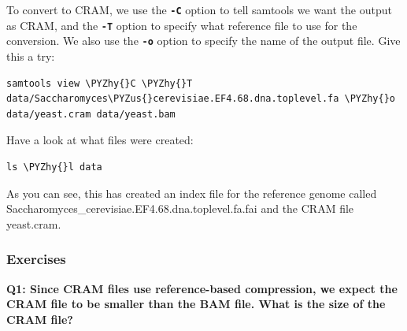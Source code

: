 \documentclass[11pt]{article}
\makeatletter
\def\PYZus{\char`\_}
\def\PYZhy{\char`\-}
\newcommand{\boxspacing}{\kern\kvtcb@left@rule\kern\kvtcb@boxsep}
\newcommand{\prompt}[4]{
        {\ttfamily\llap{{\color{#2}[#3]:\hspace{3pt}#4}}\vspace{-\baselineskip}}
    }
\makeatother
\begin{document}
To convert to CRAM, we use the \textbf{\texttt{-C}} option to tell
samtools we want the output as CRAM, and the \textbf{\texttt{-T}} option
to specify what reference file to use for the conversion. We also use
the \textbf{\texttt{-o}} option to specify the name of the output file.
Give this a try:

    \begin{tcolorbox}[breakable, size=fbox, boxrule=1pt, pad at break*=1mm,colback=cellbackground, colframe=cellborder]
\prompt{In}{incolor}{ }{\boxspacing}
\begin{Verbatim}[commandchars=\\\{\}]
samtools view \PYZhy{}C \PYZhy{}T data/Saccharomyces\PYZus{}cerevisiae.EF4.68.dna.toplevel.fa \PYZhy{}o data/yeast.cram data/yeast.bam
\end{Verbatim}
\end{tcolorbox}

    Have a look at what files were created:

    \begin{tcolorbox}[breakable, size=fbox, boxrule=1pt, pad at break*=1mm,colback=cellbackground, colframe=cellborder]
\prompt{In}{incolor}{ }{\boxspacing}
\begin{Verbatim}[commandchars=\\\{\}]
ls \PYZhy{}l data
\end{Verbatim}
\end{tcolorbox}

    As you can see, this has created an index file for the reference genome
called Saccharomyces\_cerevisiae.EF4.68.dna.toplevel.fa.fai and the CRAM
file yeast.cram.

    \hypertarget{exercises}{%
\subsubsection{Exercises}\label{exercises}}

\textbf{Q1: Since CRAM files use reference-based compression, we expect
the CRAM file to be smaller than the BAM file. What is the size of the
CRAM file?}

    \begin{tcolorbox}[breakable, size=fbox, boxrule=1pt, pad at break*=1mm,colback=cellbackground, colframe=cellborder]
\prompt{In}{incolor}{ }{\boxspacing}
\begin{Verbatim}[commandchars=\\\{\}]

\end{Verbatim}
\end{tcolorbox}
\end{document}
